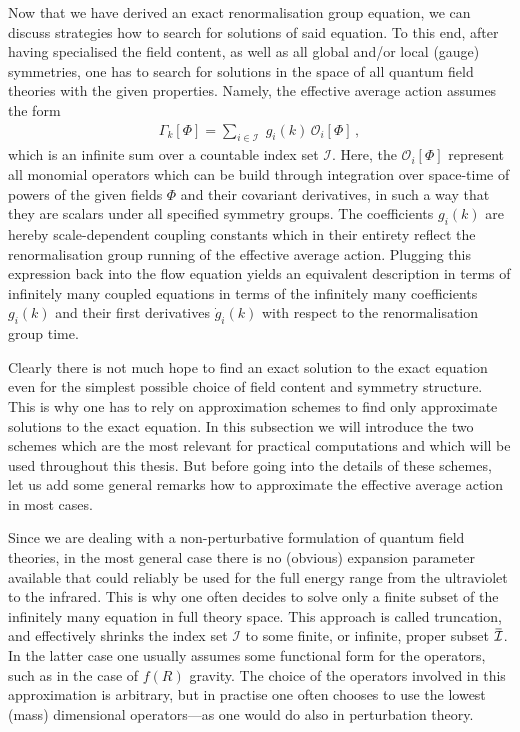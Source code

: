 \documentclass[11pt]{book}
\newcommand{\overbar}[1]{\mkern 1.5mu\overline{\mkern-1.5mu#1\mkern-1.5mu}\mkern 1.5mu}
\numberwithin{equation}{chapter}
\begin{document}
Now that we have derived an exact renormalisation group equation,
we can discuss strategies how to search for solutions of said equation.
To this end, after having specialised the field content, as well as
all global and/or local (gauge) symmetries, one has to search for solutions
in the space of all quantum field theories with the given properties.
Namely, the effective average action assumes the form
\begin{align}
  \Gamma_k[\Phi] = \sum_{i \in \mathcal I} \; g_i(k) \, \mathcal O_i [\Phi] \,,
  \label{eq:expansionGamma}
\end{align}
which is an infinite sum over a countable index set $\mathcal I$.
Here, the $\mathcal O_i [\Phi]$ represent all monomial operators
which can be build through integration over space-time of powers of
the given fields $\Phi$ and their covariant derivatives, in such a way
that they are scalars under all specified symmetry groups. The coefficients
$g_i(k)$ are hereby scale-dependent coupling constants which in their entirety reflect
the renormalisation group running of the effective average action.
Plugging this expression back into the flow equation yields an equivalent
description in terms of infinitely many coupled equations
in terms of the infinitely many coefficients $g_i(k)$ and their
first derivatives $\dot g_i(k)$ with respect to the renormalisation
group time.

Clearly there is not much hope to find an exact solution to the exact
equation even for the simplest possible choice of field content and
symmetry structure. This is why one has to rely on approximation schemes
to find only approximate solutions to the exact equation. In this
subsection we will introduce the two schemes which are the most relevant for
practical computations and which will be used throughout this thesis.
But before going into the details of these schemes, let us add some
general remarks how to approximate the effective average action in most
cases.

Since we are dealing with a non-perturbative formulation of quantum field
theories, in the most general case there is no (obvious) expansion
parameter available that could reliably be used for the full energy
range from the ultraviolet to the infrared. This is why one often decides
to solve only a finite subset of the infinitely many equation in full theory
space. This approach is called truncation, and effectively shrinks the
index set $\mathcal I$ to some finite, or
infinite, proper subset $\overbar{\mathcal I}$. In the latter case
one usually assumes some functional form for the operators, such as in the
case of $f(R)$ gravity. The choice of the operators involved
in this approximation is arbitrary, but in practise one often chooses
to use the lowest (mass) dimensional operators---as one would do also
in perturbation theory.
\end{document}

